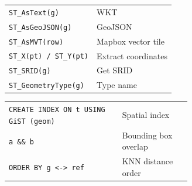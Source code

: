\documentclass[10pt]{extarticle}
\begin{document}
\begin{multicols}{2}
\begin{tabularx}{\linewidth}{@{}l@{\enspace}Y@{}}
\texttt{ST\_AsText(g)}              & WKT \\
\texttt{ST\_AsGeoJSON(g)}           & GeoJSON \\
\texttt{ST\_AsMVT(row)}             & Mapbox vector tile \\
\texttt{ST\_X(pt) / ST\_Y(pt)}      & Extract coordinates \\
\texttt{ST\_SRID(g)}                & Get SRID \\
\texttt{ST\_GeometryType(g)}        & Type name \\
\end{tabularx}

\begin{tabularx}{\linewidth}{@{}>{\raggedright\arraybackslash}p{0.62\linewidth}@{\enspace}Y@{}}
\texttt{CREATE INDEX ON t USING GiST (geom)} & Spatial index \\
\texttt{a \&\& b}                    & Bounding box overlap \\
\texttt{ORDER BY g <-> ref}         & KNN distance order \\
\end{tabularx}

\end{multicols}
\end{document}
